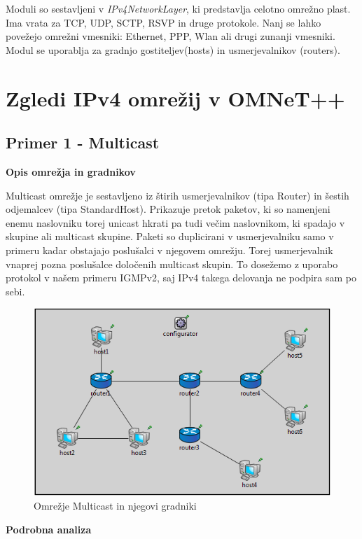 \documentclass[a4paper,11pt]{article}
\begin{document}
Moduli so sestavljeni v \textit{IPv4NetworkLayer}, ki predstavlja celotno omrežno plast. Ima vrata za TCP, UDP, SCTP, RSVP in druge protokole.  Nanj se lahko povežejo omrežni vmesniki: Ethernet, PPP, Wlan ali drugi zunanji vmesniki. Modul se uporablja za gradnjo gostiteljev(hosts) in usmerjevalnikov (routers).
\pagebreak
\setlength{\parindent}{0pt}
\section{Zgledi IPv4 omrežij v OMNeT++}
\subsection{Primer 1 - Multicast}

\large \bf Opis omrežja in gradnikov\par
\normalfont \normalsize 
\setlength{\parindent}{10pt}
Multicast omrežje je sestavljeno iz štirih usmerjevalnikov (tipa Router) in šestih odjemalcev (tipa StandardHost). Prikazuje pretok paketov, ki so namenjeni enemu naslovniku torej unicast hkrati pa tudi večim naslovnikom, ki spadajo v skupine ali multicast skupine. Paketi so duplicirani v usmerjevalniku samo v primeru kadar obstajajo poslušalci v njegovem omrežju. Torej usmerjevalnik vnaprej pozna poslušalce določenih multicast skupin. To dosežemo z uporabo protokol v našem primeru IGMPv2, saj IPv4 takega delovanja ne podpira sam po sebi.
\begin{figure}[h]
	\centering
	\includegraphics[width=\textwidth]{Multicast.png}
	\caption{Omrežje Multicast in njegovi gradniki}
	\label{Multicast}	
\end{figure}\par
\setlength{\parindent}{0pt}
\large\bf Podrobna analiza\par
\end{document}
